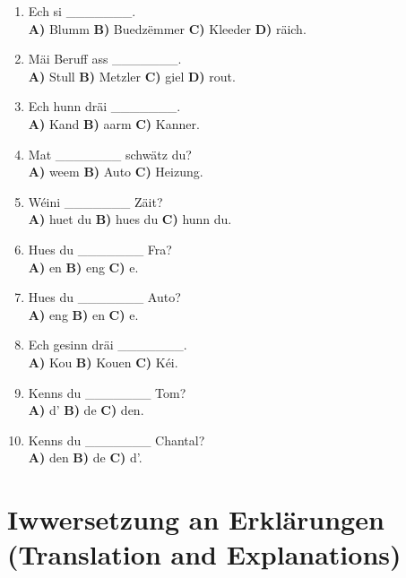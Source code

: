 \begin{enumerate}
    \item Ech si \_\_\_\_\_\_\_. \\
    \textbf{A)} Blumm \quad \textbf{B)} Buedzëmmer \quad \textbf{C)} Kleeder \quad \textbf{D)} räich.
    
    \item Mäi Beruff ass \_\_\_\_\_\_\_. \\
    \textbf{A)} Stull \quad \textbf{B)} Metzler \quad \textbf{C)} giel \quad \textbf{D)} rout.
    
    \item Ech hunn dräi \_\_\_\_\_\_\_. \\
    \textbf{A)} Kand \quad \textbf{B)} aarm \quad \textbf{C)} Kanner.
    
    \item Mat \_\_\_\_\_\_\_ schwätz du? \\
    \textbf{A)} weem \quad \textbf{B)} Auto \quad \textbf{C)} Heizung.
    
    \item Wéini \_\_\_\_\_\_\_ Zäit? \\
    \textbf{A)} huet du \quad \textbf{B)} hues du \quad \textbf{C)} hunn du.
    
    \item Hues du \_\_\_\_\_\_\_ Fra? \\
    \textbf{A)} en \quad \textbf{B)} eng \quad \textbf{C)} e.
    
    \item Hues du \_\_\_\_\_\_\_ Auto? \\
    \textbf{A)} eng \quad \textbf{B)} en \quad \textbf{C)} e.
    
    \item Ech gesinn dräi \_\_\_\_\_\_\_. \\
    \textbf{A)} Kou \quad \textbf{B)} Kouen \quad \textbf{C)} Kéi.
    
    \item Kenns du \_\_\_\_\_\_\_ Tom? \\
    \textbf{A)} d' \quad \textbf{B)} de \quad \textbf{C)} den.
    
    \item Kenns du \_\_\_\_\_\_\_ Chantal? \\
    \textbf{A)} den \quad \textbf{B)} de \quad \textbf{C)} d'.
\end{enumerate}


\section{Iwwersetzung an Erklärungen (Translation and Explanations)}


